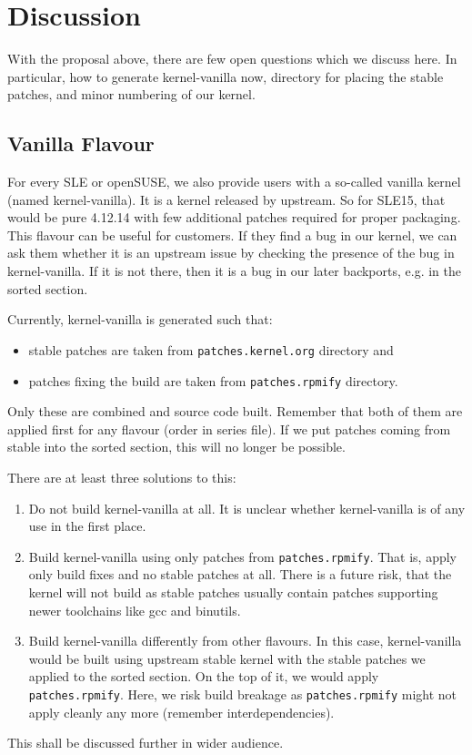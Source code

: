 \documentclass[10pt]{llncs}
\newcommand{\code}[2][]{\lstinline[columns=fullflexible, #1]$#2$}
\newcommand{\file}[2][]{\code[language={}, #1]{#2}}
\begin{document}
\section{Discussion} \label{sec:discussion}
With the proposal above, there are few open questions which we discuss here.
In particular, how to generate kernel-vanilla now, directory for placing the
stable patches, and minor numbering of our kernel.

\subsection{Vanilla Flavour}
For every SLE or openSUSE, we also provide users with a so-called vanilla
kernel (named kernel-vanilla). It is a kernel released by upstream. So for
SLE15, that would be pure 4.12.14 with few additional patches required for
proper packaging. This flavour can be useful for customers. If they find a bug
in our kernel, we can ask them whether it is an upstream issue by checking the
presence of the bug in kernel-vanilla. If it is not there, then it is a bug in
our later backports, e.g. in the sorted section.

Currently, kernel-vanilla is generated such that:
\begin{itemize}
  \item stable patches are taken from \file{patches.kernel.org} directory and
  \item patches fixing the build are taken from \file{patches.rpmify}
    directory.
\end{itemize}
Only these are combined and source code built. Remember that both of them are
applied first for any flavour (order in series file). If we put patches coming
from stable into the sorted section, this will no longer be possible.

There are at least three solutions to this:
\begin{enumerate}
  \item Do not build kernel-vanilla at all. It is unclear whether
    kernel-vanilla is of any use in the first place.
  \item Build kernel-vanilla using only patches from \file{patches.rpmify}.
    That is, apply only build fixes and no stable patches at all. There is a
    future risk, that the kernel will not build as stable patches usually
    contain patches supporting newer toolchains like gcc and binutils.
  \item Build kernel-vanilla differently from other flavours. In this case,
    kernel-vanilla would be built using upstream stable kernel with the stable
    patches we applied to the sorted section. On the top of it, we would apply
    \file{patches.rpmify}.  Here, we risk build breakage as
    \file{patches.rpmify} might not apply cleanly any more (remember
    interdependencies).
\end{enumerate}
This shall be discussed further in wider audience.
\end{document}
